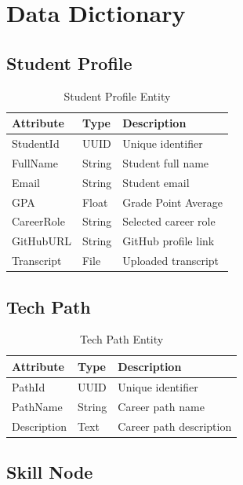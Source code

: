 
\section{Data Dictionary}

\subsection{Student Profile}

\begin{table}[H]
\centering
\caption{Student Profile Entity}
\begin{tabular}{|l|l|p{8cm}|}
\hline
\textbf{Attribute} & \textbf{Type} & \textbf{Description} \\ \hline

StudentId & UUID & Unique identifier \\ \hline
FullName & String & Student full name \\ \hline
Email & String & Student email \\ \hline
GPA & Float & Grade Point Average \\ \hline
CareerRole & String & Selected career role \\ \hline
GitHubURL & String & GitHub profile link \\ \hline
Transcript & File & Uploaded transcript \\ \hline

\end{tabular}
\end{table}

\subsection{Tech Path}

\begin{table}[H]
\centering
\caption{Tech Path Entity}
\begin{tabular}{|l|l|p{8cm}|}
\hline
Attribute & Type & Description \\ \hline
PathId & UUID & Unique identifier \\ \hline
PathName & String & Career path name \\ \hline
Description & Text & Career path description \\ \hline
\end{tabular}
\end{table}

\subsection{Skill Node}

